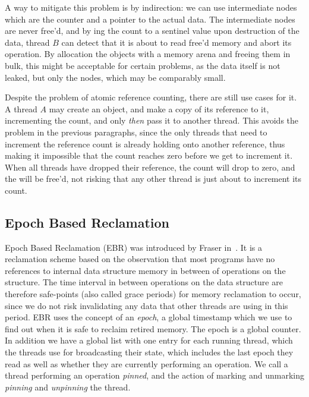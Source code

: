 A way to mitigate this problem is by indirection: we can use intermediate  nodes which are
the counter and a pointer to the actual data. The intermediate nodes are never free'd, and by
ing the count to a sentinel value upon destruction of the data, thread $B$ can detect
that it is about to read free'd memory and abort its operation. By allocation the  objects
with a memory arena and freeing them in bulk, this might be acceptable for certain problems, as the
data itself is not leaked, but only the  nodes, which may be comparably small.

Despite the problem of atomic reference counting, there are still use cases for it. A thread $A$
may create an  object, and make a copy of its reference to it, incrementing the count,
and only \emph{then} pass it to another thread. This avoids the problem in the previous paragraphs,
since the only threads that need to increment the reference count is already holding onto another
reference, thus making it impossible that the count reaches zero before we get to increment it.
When all threads have dropped their reference, the count will drop to zero, and the  will
be free'd, not risking that any other thread is just about to increment its count.


\subsection{Epoch Based Reclamation\label{sec:background-ebr}}

Epoch Based Reclamation (EBR) was introduced by Fraser in~\cite{fraser2004practical}. It is a
reclamation scheme based on the observation that most programs have no references to internal data
structure memory in between of operations on the structure. The time interval in between operations
on the data structure are therefore safe-points (also called grace periods) for memory reclamation
to occur, since we do not risk invalidating any data that other threads are using in this period.
EBR uses the concept of an \emph{epoch}, a global timestamp which we use to find out when it is
safe to reclaim retired memory. The epoch is a global counter. In addition we have a global list
with one entry for each running thread, which the threads use for broadcasting their state, which
includes the last epoch they read as well as whether they are currently performing an operation. We
call a thread performing an operation \emph{pinned}, and the action of marking and unmarking
\emph{pinning} and \emph{unpinning} the thread.

